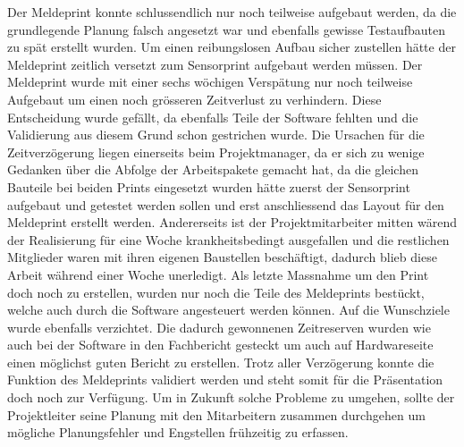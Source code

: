 Der Meldeprint konnte schlussendlich nur noch teilweise aufgebaut werden, da die grundlegende Planung falsch angesetzt war und ebenfalls gewisse Testaufbauten zu spät erstellt wurden. Um einen reibungslosen Aufbau sicher zustellen hätte der Meldeprint zeitlich versetzt zum Sensorprint aufgebaut werden müssen. \newline
Der Meldeprint wurde mit einer sechs wöchigen Verspätung nur noch teilweise Aufgebaut um einen noch grösseren Zeitverlust zu verhindern. Diese Entscheidung wurde gefällt, da ebenfalls Teile der Software fehlten und die Validierung aus diesem Grund schon gestrichen wurde.  \newline
Die Ursachen für die Zeitverzögerung liegen einerseits beim Projektmanager, da er sich zu wenige Gedanken über die Abfolge der Arbeitspakete gemacht hat, da die gleichen Bauteile bei beiden Prints eingesetzt wurden hätte zuerst der Sensorprint aufgebaut und getestet werden sollen und erst anschliessend das Layout für den Meldeprint erstellt werden. Andererseits ist der Projektmitarbeiter mitten wärend der Realisierung für eine Woche krankheitsbedingt ausgefallen und die restlichen Mitglieder waren mit ihren eigenen Baustellen beschäftigt, dadurch blieb diese Arbeit während einer Woche unerledigt. \newline
Als letzte Massnahme um den Print doch noch zu erstellen, wurden nur noch die Teile des Meldeprints bestückt, welche auch durch die Software angesteuert werden können. Auf die Wunschziele wurde ebenfalls verzichtet. \newline
Die dadurch gewonnenen Zeitreserven wurden wie auch bei der Software in den Fachbericht gesteckt um auch auf Hardwareseite einen möglichst guten Bericht zu erstellen. Trotz aller Verzögerung konnte die Funktion des Meldeprints validiert werden und steht somit für die Präsentation doch noch zur Verfügung.\newline
Um in Zukunft solche Probleme zu umgehen, sollte der Projektleiter seine Planung mit den Mitarbeitern zusammen durchgehen um mögliche Planungsfehler und Engstellen frühzeitig zu erfassen. 
